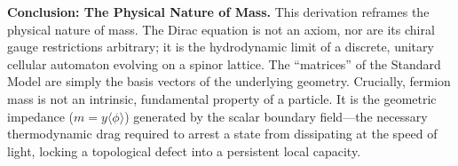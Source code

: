\textbf{Conclusion: The Physical Nature of Mass.} This derivation reframes the physical nature of mass. The Dirac equation is not an axiom, nor are its chiral gauge restrictions arbitrary; it is the hydrodynamic limit of a discrete, unitary cellular automaton evolving on a spinor lattice. The ``matrices'' of the Standard Model are simply the basis vectors of the underlying geometry. Crucially, fermion mass is not an intrinsic, fundamental property of a particle. It is the geometric impedance ($m = y\langle\phi\rangle$) generated by the scalar boundary field—the necessary thermodynamic drag required to arrest a state from dissipating at the speed of light, locking a topological defect into a persistent local capacity.